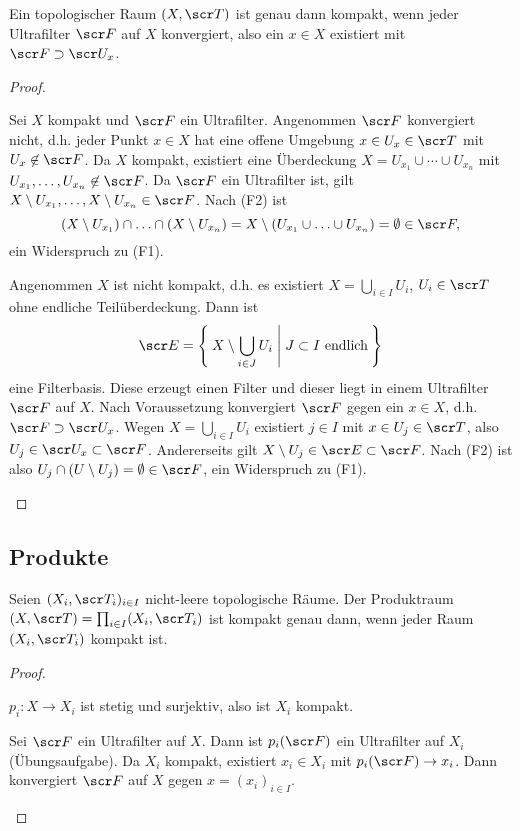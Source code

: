 \begin{st}
	Ein topologischer Raum $(X, \scr T)$ ist genau dann kompakt, wenn jeder Ultrafilter $\scr F$ auf $X$ konvergiert, also ein $x \in X$ existiert mit $\scr F \supset \scr U_x$.
	\begin{proof}
		\begin{segnb}[„$\implies$“]
			Sei $X$ kompakt und $\scr F$ ein Ultrafilter.
			Angenommen $\scr F$ konvergiert nicht, d.h. jeder Punkt $x \in X$ hat eine offene Umgebung $x \in U_x \in \scr T$ mit $U_x \not\in \scr F$.
			Da $X$ kompakt, existiert eine Überdeckung $X = U_{x_1} \cup \dotsb \cup U_{x_n}$ mit $U_{x_1}, \dotsc, U_{x_n} \not\in \scr F$.
			Da $\scr F$ ein Ultrafilter ist, gilt $X \setminus U_{x_1}, \dotsc, X \setminus U_{x_n} \in \scr F$.
			Nach (F2) ist
			\[
				(X \setminus U_{x_1}) \cap \dotsc \cap (X \setminus U_{x_n})
				= X \setminus (U_{x_1} \cup \dotsc \cup U_{x_n})
				= \emptyset \in \scr F,
			\]
			ein Widerspruch zu (F1).
		\end{segnb}
		\begin{segnb}[„$\impliedby$“]
			Angenommen $X$ ist nicht kompakt, d.h. es existiert $X = \bigcup_{i\in I} U_i$, $U_i \in \scr T$ ohne endliche Teilüberdeckung.
			Dann ist
			\[
				\scr E
				= \Set{ X \setminus \bigcup_{i\in J} U_i | J \subset I \text{ endlich} }
			\]
			eine Filterbasis.
			Diese erzeugt einen Filter und dieser liegt in einem Ultrafilter $\scr F$ auf $X$.
			Nach Voraussetzung konvergiert $\scr F$ gegen ein $x \in X$, d.h. $\scr F \supset \scr U_x$.
			Wegen $X = \bigcup_{i\in I} U_i$ existiert $j \in I$ mit $x \in U_j \in \scr T$, also $U_j \in \scr U_x \subset \scr F$.
			Andererseits gilt $X \setminus U_j \in \scr E \subset \scr F$.
			Nach (F2) ist also $U_j \cap (U \setminus U_j) = \emptyset \in \scr F$, ein Widerspruch zu (F1).
		\end{segnb}
	\end{proof}
\end{st}

\subsection{Produkte}

\begin{st}[Tychonoff, 1930]
	Seien $(X_i, \scr T_i)_{i\in I}$ nicht-leere topologische Räume.
	Der Produktraum $(X, \scr T) = \prod_{i\in I} (X_i, \scr T_i)$ ist kompakt genau dann, wenn jeder Raum $(X_i, \scr T_i)$ kompakt ist.
	\begin{proof}
		\begin{segnb}[„$\implies$“]
			$p_i: X \to X_i$ ist stetig und surjektiv, also ist $X_i$ kompakt.
		\end{segnb}
		\begin{segnb}[„$\impliedby$“]
			Sei $\scr F$ ein Ultrafilter auf $X$.
			Dann ist $p_i(\scr F)$ ein Ultrafilter auf $X_i$ (Übungsaufgabe). %
			Da $X_i$ kompakt, existiert $x_i \in X_i$ mit $p_i(\scr F) \to x_i$.
			Dann konvergiert $\scr F$ auf $X$ gegen $x = (x_i)_{i\in I}$.
		\end{segnb}
	\end{proof}
\end{st}

